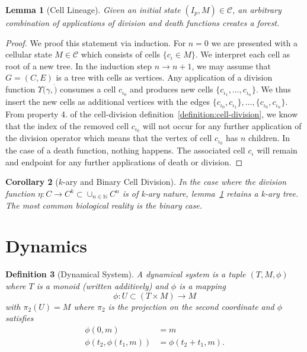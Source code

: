 \documentclass{article}
\newtheorem{definition}{Definition}[section]
\newtheorem{lemma}[definition]{Lemma}
\newtheorem{corollary}[definition]{Corollary}
\begin{document}
\begin{lemma}[Cell Lineage]
    \label{lemma:cell-lineage}
    Given an initial state $(I_p,M)\in\mathscr{C}$, an arbitrary combination of applications of
    division and death functions creates a forest.
\end{lemma}
\begin{proof}
    We proof this statement via induction. For $n=0$ we are presented with a cellular state
    $M\in\mathscr{C}$ which consists of cells $\{c_\iota\in M\}$.
    We interpret each cell as root of a new tree.
    In the induction step $n\rightarrow n+1$, we may assume that $G=(C,E)$ is a tree with
    cells as vertices.
    Any application of a division function $\Upsilon(\gamma, \dot)$ consumes a cell $c_{\iota_0}$
    and produces new cells $\{c_{\iota_1},\dots,c_{\iota_n}\}$.
    We thus insert the new cells as additional vertices with the edges
    $\{c_{\iota_0},c_{\iota_1}\},\dots,\{c_{\iota_0},c_{\iota_n}\}$.
    From property 4. of the cell-division definition~\ref{definition:cell-division}, we know that
    the index of the removed cell $c_{\iota_0}$ will not occur for any further application of the
    division operator which means that the vertex of cell $c_{\iota_0}$ has $n$ children.
    In the case of a death function, nothing happens.
    The associated cell $c_\iota$ will remain and endpoint for any further applications of death
    or division.
\end{proof}
\begin{corollary}[$k$-ary and Binary Cell Division]
    In the case where the division function $\eta:C\rightarrow C^k\subset\cup_{n\in\mathbb{N}}C^n$
    is of k-ary nature, lemma~\ref{lemma:cell-lineage} retains a k-ary tree.
    The most common biological reality is the binary case.
\end{corollary}

\section{Dynamics}
\label{section:dynamics}
\begin{definition}[Dynamical System]
    A dynamical system is a tuple $(T,M,\phi)$ where $T$ is a monoid (written additively) and
    $\phi$ is a mapping
    \begin{equation}
        \phi : U\subset(T\times M) \rightarrow M
    \end{equation}
    with $\pi_2(U) = M$ where $\pi_2$ is the projection on the second coordinate and $\phi$
    satisfies
    \begin{align}
        \phi(0,m) &= m\\
        \phi(t_2, \phi(t_1, m)) &= \phi(t_2+t_1,m).
    \end{align}
\end{definition}
\end{document}
